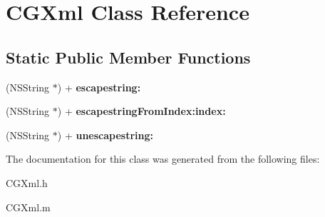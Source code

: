 \hypertarget{interface_c_g_xml}{\section{C\-G\-Xml Class Reference}
\label{interface_c_g_xml}
}
\subsection*{Static Public Member Functions}
\begin{DoxyCompactItemize}
\item 
\hypertarget{interface_c_g_xml_a47b307dc9f713c3f6abc2766b9631b40}{(N\-S\-String $\ast$) + {\bfseries escapestring\-:}}\label{interface_c_g_xml_a47b307dc9f713c3f6abc2766b9631b40}

\item 
\hypertarget{interface_c_g_xml_a85cda9ddd835e02f6407cc0d4f4c3bb0}{(N\-S\-String $\ast$) + {\bfseries escapestring\-From\-Index\-:index\-:}}\label{interface_c_g_xml_a85cda9ddd835e02f6407cc0d4f4c3bb0}

\item 
\hypertarget{interface_c_g_xml_aa7fd791e502cf329fa295927cf255e9c}{(N\-S\-String $\ast$) + {\bfseries unescapestring\-:}}\label{interface_c_g_xml_aa7fd791e502cf329fa295927cf255e9c}

\end{DoxyCompactItemize}


The documentation for this class was generated from the following files\-:\begin{DoxyCompactItemize}
\item 
C\-G\-Xml.\-h\item 
C\-G\-Xml.\-m\end{DoxyCompactItemize}
